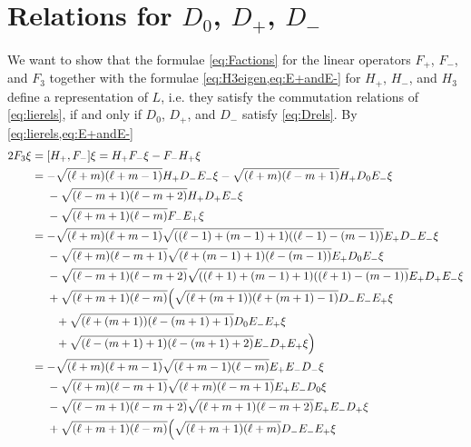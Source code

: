 \section{\texorpdfstring{Relations for $D_0$, $D_+$, $D_-$}{Relations for D\_0,D\_+,D\_-}}

We want to show that the formulae \cref{eq:Factions} for the linear operators $F_+$, $F_-$, and $F_3$ together with the formulae \cref{eq:H3eigen,eq:E+andE-} for $H_+$, $H_-$, and $H_3$ define a representation of $L$, i.e. they satisfy the commutation relations of \cref{eq:lierels}, if and only if $D_0$, $D_+$, and $D_-$ satisfy \cref{eq:Drels}.
By \cref{eq:lierels,eq:E+andE-}
\begin{align*}
  2F_3 \xi &= [H_+,F_-]\xi = H_+F_- \xi - F_-H_+ \xi \\
           &= -\sqrt{(\ell+m)(\ell+m-1)} H_+D_-E_- \xi - \sqrt{(\ell+m)(\ell-m+1)} H_+D_0E_- \xi \\*
           &\phantom{{}={}}{} - \sqrt{(\ell-m+1)(\ell-m+2)} H_+D_+E_- \xi \\*
           &\phantom{{}={}}{} - \sqrt{(\ell+m+1)(\ell-m)}F_-E_+\xi \\
           &= -\sqrt{(\ell+m)(\ell+m-1)}\sqrt{((\ell-1)+(m-1)+1)((\ell-1)-(m-1))} E_+D_-E_- \xi \\*
           &\phantom{{}={}}{} - \sqrt{(\ell+m)(\ell-m+1)} \sqrt{(\ell+(m-1)+1)(\ell-(m-1))} E_+D_0E_- \xi \\*
           &\phantom{{}={}}{} - \sqrt{(\ell-m+1)(\ell-m+2)}\sqrt{((\ell+1)+(m-1)+1)((\ell+1)-(m-1))} E_+D_+E_- \xi \\*
           &\phantom{{}={}}{} + \sqrt{(\ell+m+1)(\ell-m)} \Bigl( \sqrt{(\ell+(m+1))(\ell+(m+1)-1)}D_-E_-E_+\xi \\*
           &\phantom{{}={}()}{} + \sqrt{(\ell+(m+1))(\ell-(m+1)+1)}D_0E_-E_+\xi \\*
           &\phantom{{}={}()}{} + \sqrt{(\ell-(m+1)+1)(\ell-(m+1)+2)} E_-D_+E_+ \xi \Bigr) \\
           &= -\sqrt{(\ell+m)(\ell+m-1)}\sqrt{(\ell+m-1)(\ell-m)} E_+E_-D_- \xi \\*
           &\phantom{{}={}}{} - \sqrt{(\ell+m)(\ell-m+1)} \sqrt{(\ell+m)(\ell-m+1)} E_+E_-D_0 \xi \\*
           &\phantom{{}={}}{} - \sqrt{(\ell-m+1)(\ell-m+2)}\sqrt{(\ell+m+1)(\ell-m+2)} E_+E_-D_+ \xi \\*
           &\phantom{{}={}}{} + \sqrt{(\ell+m+1)(\ell-m)} \Bigl( \sqrt{(\ell+m+1)(\ell+m)}D_-E_-E_+\xi \\*

\end{align*}
